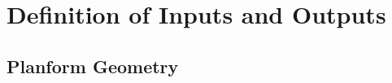 \documentclass{article}
\begin{document}
\section{Definition of Inputs and Outputs}
\subsection{Planform Geometry}
\end{document}
